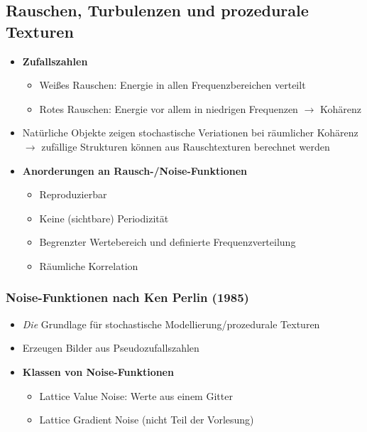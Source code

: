 \subsection{Rauschen, Turbulenzen und prozedurale Texturen}
\begin{itemize}
	\item \textbf{Zufallszahlen}
	\begin{itemize}
		\item Weißes Rauschen: Energie in allen Frequenzbereichen verteilt
		\item Rotes Rauschen: Energie vor allem in niedrigen Frequenzen \(\rightarrow\) Kohärenz
	\end{itemize}
	\item Natürliche Objekte zeigen stochastische Veriationen bei räumlicher Kohärenz \(\rightarrow\) zufällige Strukturen können aus Rauschtexturen berechnet werden
	\item \textbf{Anorderungen an Rausch-/Noise-Funktionen}
	\begin{itemize}
		\item Reproduzierbar
		\item Keine (sichtbare) Periodizität
		\item Begrenzter Wertebereich und definierte Frequenzverteilung
		\item Räumliche Korrelation
	\end{itemize}
\end{itemize}

\subsubsection{Noise-Funktionen nach Ken Perlin (1985)}
\begin{itemize}
	\item \textit{Die} Grundlage für stochastische Modellierung/prozedurale Texturen
	\item Erzeugen Bilder aus Pseudozufallszahlen
	\item \textbf{Klassen von Noise-Funktionen}
	\begin{itemize}
		\item Lattice Value Noise: Werte aus einem Gitter
		\item Lattice Gradient Noise (nicht Teil der Vorlesung)
	\end{itemize}
\end{itemize}

